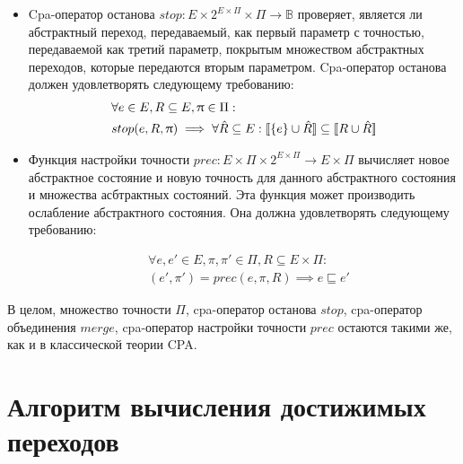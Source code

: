 \begin{itemize}
\item Cpa-оператор останова $stop: E \times 2^{E \times \Pi} \times \Pi \rightarrow \mathbb{B}$ проверяет, является ли абстрактный переход, передаваемый, как первый параметр с точностью, передаваемой как третий параметр, покрытым множеством абстрактных переходов, которые передаются вторым параметром.
Cpa-оператор останова должен удовлетворять следующему требованию:
\begin{equation}
\label{cpa_stop_eq}
\begin{aligned}
&\forall e \in E, R \subseteq E, \uppi \in \Pi:\\
&stop(e, R, \uppi) \implies\forall \hat R \subseteq E: [\![ \{e\}\cup \hat R ]\!] \subseteq [\![ R \cup \hat R ]\!]
\end{aligned}
\end{equation}

\item Функция настройки точности $prec:E \times \Pi \times 2^{E \times \Pi} \rightarrow E \times \Pi$ вычисляет новое абстрактное состояние и новую точность для данного абстрактного состояния и множества асбтрактных состояний.
Эта функция может производить ослабление абстрактного состояния.
Она должна удовлетворять следующему требованию:

\begin{equation}
\label{cpa_prec_eq}
\begin{aligned}
& \forall e, e' \in E, \pi, \pi' \in \Pi, R \subseteq E \times \Pi:\\
& (e', \pi') = prec(e, \pi, R) \implies e \sqsubseteq e'
\end{aligned}
\end{equation}

\end{itemize}

В целом, множество точности $\Pi$, cpa-оператор останова $stop$, cpa-оператор объединения $merge$, cpa-оператор настройки точности $prec$ остаются такими же, как и в классической теории CPA.

\section{Алгоритм вычисления достижимых переходов}

